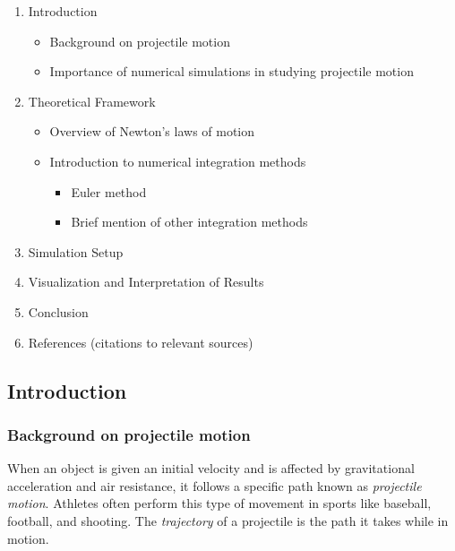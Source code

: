 \documentclass[11pt]{article}
\providecommand{\tightlist}{%
      \setlength{\itemsep}{0pt}\setlength{\parskip}{0pt}}
\begin{document}
\begin{enumerate}
\def\labelenumi{\arabic{enumi}.}
\item
  Introduction

  \begin{itemize}
  \tightlist
  \item
    Background on projectile motion
  \item
    Importance of numerical simulations in studying projectile motion
  \end{itemize}
\item
  Theoretical Framework

  \begin{itemize}
  \tightlist
  \item
    Overview of Newton's laws of motion
  \item
    Introduction to numerical integration methods

    \begin{itemize}
    \tightlist
    \item
      Euler method
    \item
      Brief mention of other integration methods
    \end{itemize}
  \end{itemize}
\item
  Simulation Setup
\item
  Visualization and Interpretation of Results
\item
  Conclusion
\item
  References (citations to relevant sources)
\end{enumerate}

    \hypertarget{introduction}{%
\subsection{\texorpdfstring{\textbf{Introduction}}{Introduction}}\label{introduction}}

\hypertarget{background-on-projectile-motion}{%
\subsubsection{\texorpdfstring{\textbf{Background on projectile
motion}}{Background on projectile motion}}\label{background-on-projectile-motion}}

When an object is given an initial velocity and is affected by
gravitational acceleration and air resistance, it follows a specific
path known as \emph{projectile motion}. Athletes often perform this type
of movement in sports like baseball, football, and shooting. The
\emph{trajectory} of a projectile is the path it takes while in motion.
\end{document}
